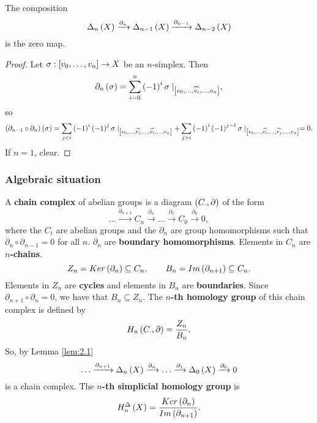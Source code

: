\begin{lemma}
\label{lem:2.1}
The composition
$$ \Delta_n\rb{X} \xrightarrow{\partial_n} \Delta_{n - 1}\rb{X} \xrightarrow{\partial_{n - 1}} \Delta_{n - 2}\rb{X} $$
is the zero map.
\end{lemma}

\begin{proof}
Let $ \sigma : \sb{v_0, \dots, v_n} \to X $ be an $ n $-simplex. Then
$$ \partial_n\rb{\sigma} = \sum_{i = 0}^n \rb{-1}^i\sigma \mid_{\sb{v_0, \dots, \widehat{v_i}, \dots, v_n}}, $$
so
$$ \rb{\partial_{n - 1} \circ \partial_n}\rb{\sigma} = \sum_{j < i} \rb{-1}^i\rb{-1}^j\sigma \mid_{\sb{v_0, \dots, \widehat{v_j}, \dots, \widehat{v_i}, \dots, v_n}} + \sum_{j > i} \rb{-1}^i\rb{-1}^{j - 1}\sigma \mid_{\sb{v_0, \dots, \widehat{v_i}, \dots, \widehat{v_j}, \dots, v_n}} = 0. $$
If $ n = 1 $, clear.
\end{proof}

\pagebreak

\subsubsection{Algebraic situation}

A \textbf{chain complex} of abelian groups is a diagram $ \rb{C_\cdot, \partial} $ of the form
$$ \dots \xrightarrow{\partial_{n + 1}} C_n \xrightarrow{\partial_n} \dots \xrightarrow{\partial_1} C_0 \xrightarrow{\partial_0} 0, $$
where the $ C_i $ are abelian groups and the $ \partial_n $ are group homomorphisms such that $ \partial_n \circ \partial_{n - 1} = 0 $ for all $ n $. $ \partial_n $ are \textbf{boundary homomorphisms}. Elements in $ C_n $ are \textbf{$ n $-chains}.
$$ Z_n = Ker\rb{\partial_n} \subseteq C_n, \qquad B_n = Im\rb{\partial_{n + 1}} \subseteq C_n. $$
Elements in $ Z_n $ are \textbf{cycles} and elements in $ B_n $ are \textbf{boundaries}. Since $ \partial_{n + 1} \circ \partial_n = 0 $, we have that $ B_n \subseteq Z_n $. The \textbf{$ n $-th homology group} of this chain complex is defined by
$$ H_n\rb{C_\cdot, \partial} = \dfrac{Z_n}{B_n}. $$
So, by Lemma \ref{lem:2.1}
$$ \dots \xrightarrow{\partial_{n + 1}} \Delta_n\rb{X} \xrightarrow{\partial_n} \dots \xrightarrow{\partial_1} \Delta_0\rb{X} \xrightarrow{\partial_0} 0 $$
is a chain complex. The \textbf{$ n $-th simplicial homology group} is
$$ H_n^\Delta\rb{X} = \dfrac{Ker\rb{\partial_n}}{Im\rb{\partial_{n + 1}}}. $$


